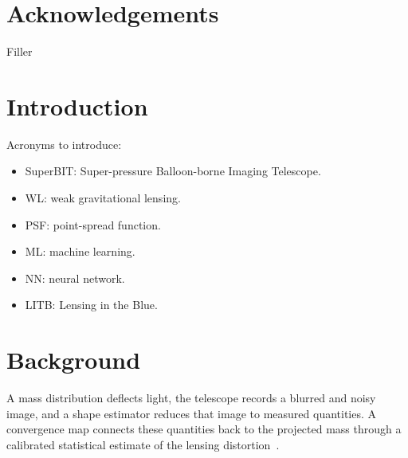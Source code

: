 \documentclass[12pt]{article}
\numberwithin{equation}{section}
\begin{document}
\clearpage
\section*{Acknowledgements}
{}
\doublespacing
\noindent
Filler

\singlespacing

\clearpage
\tableofcontents

\clearpage
{}
{}
\listoffigures

\clearpage
{}
\doublespacing

\section{Introduction}
\label{sec:introduction}
\noindent
Acronyms to introduce:
\begin{itemize}
    \item SuperBIT: Super-pressure Balloon-borne Imaging Telescope.
    \item WL: weak gravitational lensing.
    \item PSF: point-spread function.
    \item ML: machine learning.
    \item NN: neural network.
    \item LITB: Lensing in the Blue.
\end{itemize}

\section{Background}
\label{sec:background}
\noindent
A mass distribution deflects light, the telescope records a blurred and noisy image, and a shape estimator reduces that image to measured quantities. A convergence map connects these quantities back to the projected mass through a calibrated statistical estimate of the lensing distortion~\cite{bartelmann_weak_2001,mandelbaum_weak_2018}.









\clearpage
\singlespacing
{}
\printbibliography[heading=bibintoc,title={References}]
\end{document}
